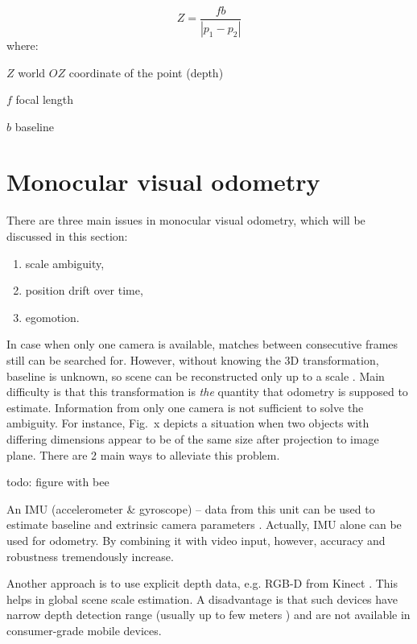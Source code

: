 \begin{equation}
Z = \frac{fb}{|p_{1}-p_{2}|}
\label{eq:disparity}
\end{equation}
where:
\begin{eqwhere}[2cm]
	\item[$Z$] world $OZ$ coordinate of the point (depth)
	\item[$f$] focal length
	\item[$b$] baseline
\end{eqwhere}


\section{Monocular visual odometry}
\label{sec:mono}

There are three main issues in monocular visual odometry, which will be discussed in this section:
\begin{enumerate}
	\item scale ambiguity,
	\item position drift over time,
	\item egomotion.
\end{enumerate}

In case when only one camera is available, matches between consecutive frames still can be searched for. However, without knowing the 3D transformation, baseline is unknown, so scene can be reconstructed only up to a scale \cite{hartley}. Main difficulty is that this transformation is \textit{the} quantity that odometry is supposed to estimate. Information from only one camera is not sufficient to solve the ambiguity. For instance, Fig.~x depicts a situation when two objects with differing dimensions appear to be of the same size after projection to image plane. There are 2 main ways to alleviate this problem.

todo: figure with bee

An IMU (accelerometer \& gyroscope) -- data from this unit can be used to estimate baseline and extrinsic camera parameters \cite{tracked_vehicles}. Actually, IMU alone can be used for odometry. By combining it with video input, however, accuracy and robustness tremendously increase.

Another approach is to use explicit depth data, e.g. RGB-D from Kinect \cite{an_improved_visual_odometry_optimization}. This helps in global scene scale estimation. A disadvantage is that such devices have narrow depth detection range (usually up to few meters \cite{accuracy_and_resoulution}) and are not available in consumer-grade mobile devices.

